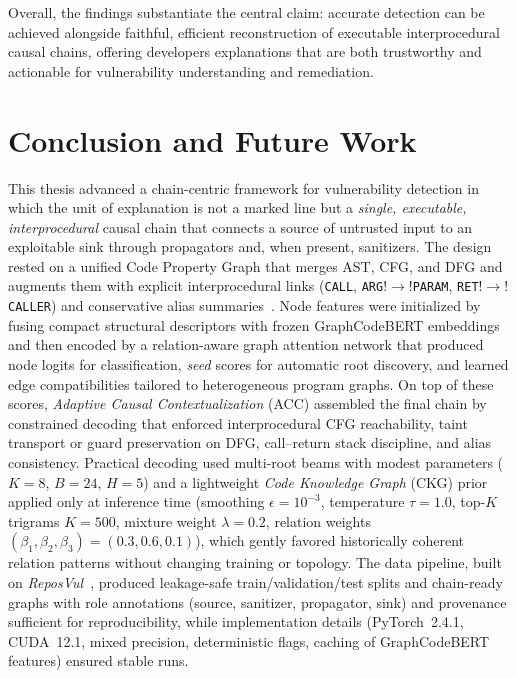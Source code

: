 \documentclass{buthesis}
\begin{document}
Overall, the findings substantiate the central claim: accurate detection can be achieved alongside faithful, efficient reconstruction of executable interprocedural causal chains, offering developers explanations that are both trustworthy and actionable for vulnerability understanding and remediation.


\chapter{Conclusion and Future Work}
\label{chap:conclusion}

This thesis advanced a chain-centric framework for vulnerability detection in which the unit of explanation is not a marked line but a \emph{single, executable, interprocedural} causal chain that connects a source of untrusted input to an exploitable sink through propagators and, when present, sanitizers. The design rested on a unified Code Property Graph that merges AST, CFG, and DFG and augments them with explicit interprocedural links (\texttt{CALL}, \texttt{ARG}$!\to!$\texttt{PARAM}, \texttt{RET}$!\to!$\texttt{CALLER}) and conservative alias summaries~\cite{yamaguchi2014cpg}. Node features were initialized by fusing compact structural descriptors with frozen GraphCodeBERT embeddings~\cite{guo2021graphcodebert} and then encoded by a relation-aware graph attention network that produced node logits for classification, \emph{seed} scores for automatic root discovery, and learned edge compatibilities tailored to heterogeneous program graphs. On top of these scores, \emph{Adaptive Causal Contextualization} (ACC) assembled the final chain by constrained decoding that enforced interprocedural CFG reachability, taint transport or guard preservation on DFG, call–return stack discipline, and alias consistency. Practical decoding used multi-root beams with modest parameters ($K{=}8$, $B{=}24$, $H{=}5$) and a lightweight \emph{Code Knowledge Graph} (CKG) prior applied only at inference time (smoothing $\epsilon{=}10^{-3}$, temperature $\tau{=}1.0$, top-$K$ trigrams $K{=}500$, mixture weight $\lambda{=}0.2$, relation weights $(\beta_1,\beta_2,\beta_3){=}(0.3,0.6,0.1)$), which gently favored historically coherent relation patterns without changing training or topology. The data pipeline, built on \emph{ReposVul}~\cite{wang2024reposvul}, produced leakage-safe train/validation/test splits and chain-ready graphs with role annotations (source, sanitizer, propagator, sink) and provenance sufficient for reproducibility, while implementation details (PyTorch~2.4.1, CUDA~12.1, mixed precision, deterministic flags, caching of GraphCodeBERT features) ensured stable runs.
\end{document}
